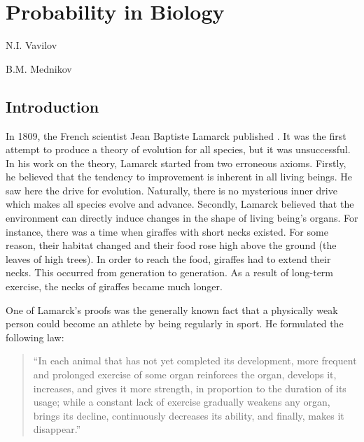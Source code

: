 
\chapter{Probability in Biology}
\begin{epigraphs}
 {N.I. Vavilov}

\vspace{5pt}

  {B.M. Mednikov}
\end{epigraphs}
\vspace{-15pt}
\section{Introduction }
 In 1809, the French scientist Jean Baptiste Lamarck published . It was the first attempt to produce a theory of evolution for all species, but it was
unsuccessful. In his work on the theory, Lamarck started from two
erroneous axioms. Firstly, he believed that the tendency to improvement
is inherent in all living beings. He saw here the drive for evolution.
Naturally, there is no mysterious inner drive which makes all species
evolve and advance.
Secondly, Lamarck believed that the environment can directly induce
changes in the shape of living being's organs. For instance, there was
a time when giraffes with short necks existed. For some reason, their
habitat changed and their food rose high above the ground (the leaves
of high trees). In order to reach the food, giraffes had to extend their
necks. This occurred from generation to generation. As a result of
long-term exercise, the necks of giraffes became much longer.

One of Lamarck's proofs was the generally known fact that
a physically weak person could become an athlete by being regularly in
sport. He formulated the following law: 
\begin{quote}
``In each animal that has not yet
completed its development, more frequent and prolonged exercise of
some organ reinforces the organ, develops it, increases, and gives it more
strength, in proportion to the duration of its usage; while a constant
lack of exercise gradually weakens any organ, brings its decline,
continuously decreases its ability, and finally, makes it disappear.''
\end{quote}


